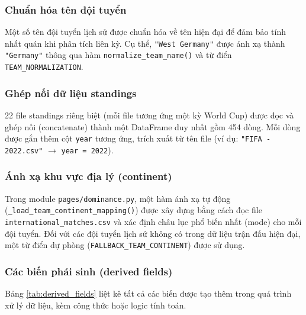 \documentclass[12pt,a4paper]{article}
\begin{document}
\subsubsection{Chuẩn hóa tên đội tuyển}
Một số tên đội tuyển lịch sử được chuẩn hóa về tên hiện đại để đảm bảo tính nhất quán khi phân tích liên kỳ. Cụ thể, \texttt{"West Germany"} được ánh xạ thành \texttt{"Germany"} thông qua hàm \texttt{normalize\_team\_name()} và từ điển \texttt{TEAM\_NORMALIZATION}.

\subsubsection{Ghép nối dữ liệu standings}
22 file standings riêng biệt (mỗi file tương ứng một kỳ World Cup) được đọc và ghép nối (concatenate) thành một DataFrame duy nhất gồm 454 dòng. Mỗi dòng được gắn thêm cột \texttt{year} tương ứng, trích xuất từ tên file (ví dụ: \texttt{"FIFA - 2022.csv"} $\rightarrow$ \texttt{year = 2022}).

\subsubsection{Ánh xạ khu vực địa lý (continent)}
Trong module \texttt{pages/dominance.py}, một hàm ánh xạ tự động (\texttt{\_load\_team\_continent\_mapping()}) được xây dựng bằng cách đọc file \texttt{international\_matches.csv} và xác định châu lục phổ biến nhất (mode) cho mỗi đội tuyển. Đối với các đội tuyển lịch sử không có trong dữ liệu trận đấu hiện đại, một từ điển dự phòng (\texttt{FALLBACK\_TEAM\_CONTINENT}) được sử dụng.

\subsubsection{Các biến phái sinh (derived fields)}
Bảng \ref{tab:derived_fields} liệt kê tất cả các biến được tạo thêm trong quá trình xử lý dữ liệu, kèm công thức hoặc logic tính toán.
\end{document}

